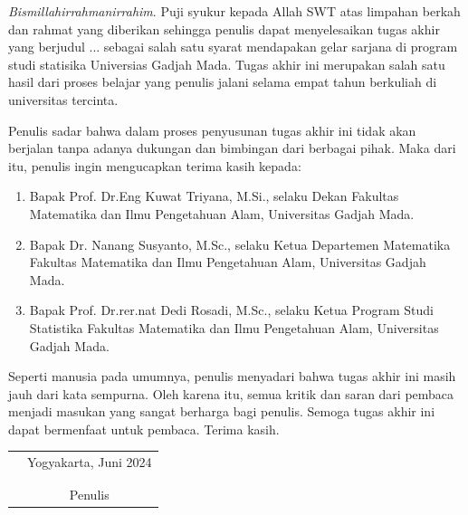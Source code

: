 \documentclass{skripsistatugm}
\begin{document}
\preface
\textit{Bismillahirrahmanirrahim}. Puji syukur kepada Allah SWT atas limpahan berkah dan rahmat yang diberikan sehingga penulis dapat menyelesaikan tugas akhir yang berjudul ... sebagai salah satu syarat mendapakan gelar sarjana di program studi statisika Universias Gadjah Mada. Tugas akhir ini merupakan salah satu hasil dari proses belajar yang penulis jalani selama empat tahun berkuliah di universitas tercinta. 
\par Penulis sadar bahwa dalam proses penyusunan tugas akhir ini tidak akan berjalan tanpa adanya dukungan dan bimbingan dari berbagai pihak. Maka dari itu, penulis ingin mengucapkan terima kasih kepada: 
\begin{enumerate}
    \item Bapak Prof. Dr.Eng Kuwat Triyana, M.Si., selaku Dekan Fakultas Matematika dan Ilmu Pengetahuan Alam, Universitas Gadjah Mada.
    \item Bapak Dr. Nanang Susyanto, M.Sc., selaku Ketua Departemen Matematika Fakultas Matematika dan Ilmu Pengetahuan Alam, Universitas Gadjah Mada.
    \item Bapak Prof. Dr.rer.nat Dedi Rosadi, M.Sc., selaku Ketua Program Studi Statistika Fakultas Matematika dan Ilmu Pengetahuan Alam, Universitas Gadjah Mada.
    
\end{enumerate}
\par Seperti manusia pada umumnya, penulis menyadari bahwa tugas akhir ini masih jauh dari kata sempurna. Oleh karena itu, semua kritik dan saran dari pembaca menjadi masukan yang sangat berharga bagi penulis. Semoga tugas akhir ini dapat bermenfaat untuk pembaca. Terima kasih. 
\vspace{0.8cm}

\begin{tabular}{p{7cm}c}
&Yogyakarta, Juni 2024\\
&\\
&\\
&Penulis
\end{tabular}
\end{document}
